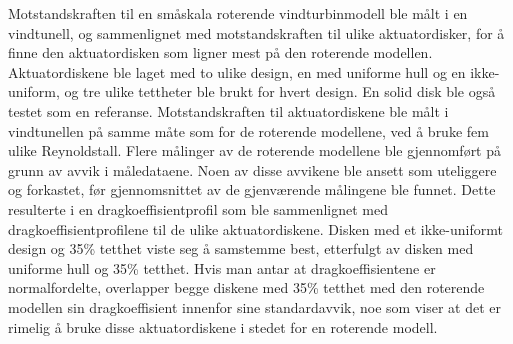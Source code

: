 Motstandskraften til en småskala roterende vindturbinmodell ble målt i en vindtunell, og sammenlignet med motstandskraften til ulike aktuatordisker, for å finne den aktuatordisken som ligner mest på den roterende modellen. Aktuatordiskene ble laget med to ulike design, en med uniforme hull og en ikke-uniform, og tre ulike tettheter ble brukt for hvert design. En solid disk ble også testet som en referanse. Motstandskraften til aktuatordiskene ble målt i vindtunellen på samme måte som for de roterende modellene, ved å bruke fem ulike Reynoldstall. Flere målinger av de roterende modellene ble gjennomført på grunn av avvik i måledataene. Noen av disse avvikene ble ansett som uteliggere og forkastet, før gjennomsnittet av de gjenværende målingene ble funnet. Dette resulterte i en dragkoeffisientprofil som ble sammenlignet med dragkoeffisientprofilene til de ulike aktuatordiskene. Disken med et ikke-uniformt design og 35\% tetthet viste seg å samstemme best, etterfulgt av disken med uniforme hull og 35\% tetthet. Hvis man antar at dragkoeffisientene er normalfordelte, overlapper begge diskene med 35\% tetthet med den roterende modellen sin dragkoeffisient innenfor sine standardavvik, noe som viser at det er rimelig å bruke disse aktuatordiskene i stedet for en roterende modell.    


